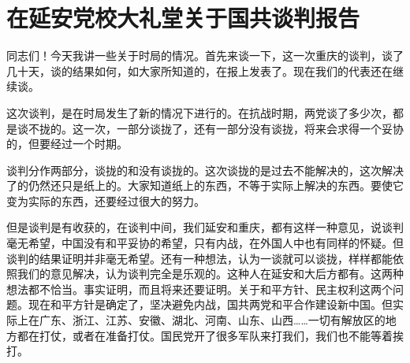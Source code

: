 \section[在延安党校大礼堂关于国共谈判报告（一九四五年十月十七日）]{在延安党校大礼堂关于国共谈判报告}


同志们！今天我讲一些关于时局的情况。首先来谈一下，这一次重庆的谈判，谈了几十天，谈的结果如何，如大家所知道的，在报上发表了。现在我们的代表还在继续谈。

这次谈判，是在时局发生了新的情况下进行的。在抗战时期，两党谈了多少次，都是谈不拢的。这一次，一部分谈拢了，还有一部分没有谈拢，将来会求得一个妥协的，但要经过一个时期。

谈判分作两部分，谈拢的和没有谈拢的。这次谈拢的是过去不能解决的，这次解决了的仍然还只是纸上的。大家知道纸上的东西，不等于实际上解决的东西。要使它变为实际的东西，还要经过很大的努力。

但是谈判是有收获的，在谈判中间，我们延安和重庆，都有这样一种意见，说谈判毫无希望，中国没有和平妥协的希望，只有内战，在外国人中也有同样的怀疑。但谈判的结果证明并非毫无希望。还有一种想法，认为一谈就可以谈拢，样样都能依照我们的意见解决，认为谈判完全是乐观的。这种人在延安和大后方都有。这两种想法都不恰当。事实证明，而且将来还要证明。关于和平方针、民主权利这两个问题。现在和平方针是确定了，坚决避免内战，国共两党和平合作建设新中国。但实际上在广东、浙江、江苏、安徽、湖北、河南、山东、山西……一切有解放区的地方都在打仗，或者在准备打仗。国民党开了很多军队来打我们，我们也不能等着挨打。

